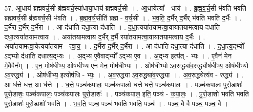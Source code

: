 \documentclass[17pt]{extarticle}
\begin{document}
57. आ॒धाय॑ ब्रह्मवर्च॒सी ब्र॑ह्मवर्च॒स्या॑धाया॒धाय॑ ब्रह्मवर्च॒सी । . आ॒धायेत्या᳚ - धाय॑ । . ब्र॒ह्म॒व॒र्च॒सी भ॑वति भवति ब्रह्मवर्च॒सी ब्र॑ह्मवर्च॒सी भ॑वति । . ब्र॒ह्म॒व॒र्च॒सीति॑ ब्रह्म - व॒र्च॒सी । . भ॒व॒ति॒ द॒र्भैर् द॒र्भैर् भ॑वति भवति द॒र्भैः । . द॒र्भैरा द॒र्भैर् द॒र्भैरा । . आ द॑धाति दधा॒त्या द॑धाति । . द॒धा॒त्यया॑तयामत्वा॒याया॑तयामत्वाय दधाति दधा॒त्यया॑तयामत्वाय । . अया॑तयामत्वाय द॒र्भैर् द॒र्भै रया॑तयामत्वा॒याया॑तयामत्वाय द॒र्भैः । . अया॑तयामत्वा॒येत्यया॑तयाम - त्वा॒य॒ । . द॒र्भैरा द॒र्भैर् द॒र्भैरा । . आ द॑धाति दधा॒त्या द॑धाति । . द॒धा॒त्य॒द्भ्यो᳚ ऽद्भ्यो द॑धाति दधात्य॒द्भ्यः । . अ॒द्भ्य ए॒वैवाद्भ्यो᳚ ऽद्भ्य ए॒व । . अ॒द्भ्य इत्य॑त् - भ्यः । . ए॒वैन॑ मेन मे॒वैवैन᳚म् । . ए॒न॒ मोष॑धीभ्य॒ ओष॑धीभ्य एन मेन॒ मोष॑धीभ्यः । . ओष॑धीभ्यो ऽव॒रुद्ध्या॑व॒रुद्ध्यौष॑धीभ्य॒ ओष॑धीभ्यो ऽव॒रुद्ध्य॑ । . ओष॑धीभ्य॒ इत्योष॑धि - भ्यः॒ । . अ॒व॒रुद्ध्या ऽव॒रुद्ध्या॑व॒रुद्ध्या । . अ॒व॒रुद्ध्येत्य॑व - रुद्ध्य॑ । . आ ध॑त्ते धत्त॒ आ ध॑त्ते । . ध॒त्ते॒ पञ्च॑कपालः॒ पञ्च॑कपालो धत्ते धत्ते॒ पञ्च॑कपालः । . पञ्च॑कपालः पुरो॒डाशः॑ पुरो॒डाशः॒ पञ्च॑कपालः॒ पञ्च॑कपालः पुरो॒डाशः॑ । . पञ्च॑कपाल॒ इति॒ पञ्च॑ - क॒पा॒लः॒ । . पु॒रो॒डाशो॑ भवति भवति पुरो॒डाशः॑ पुरो॒डाशो॑ भवति । . भ॒व॒ति॒ पञ्च॒ पञ्च॑ भवति भवति॒ पञ्च॑ । . पञ्च॒ वै वै पञ्च॒ पञ्च॒ वै । \newline
\end{document}
